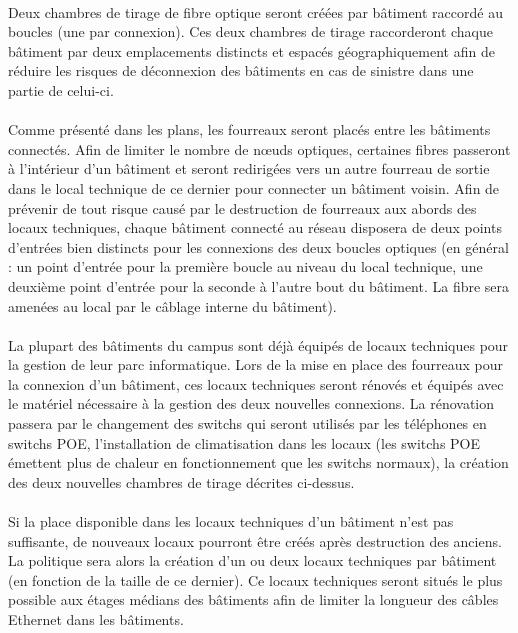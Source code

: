 \paragraph{} Deux chambres de tirage de fibre optique seront créées par bâtiment raccordé au boucles (une par connexion). Ces deux chambres de tirage raccorderont chaque bâtiment par deux emplacements distincts et espacés géographiquement afin de réduire les risques de déconnexion des bâtiments en cas de sinistre dans une partie de celui-ci.

\paragraph{} Comme présenté dans les plans, les fourreaux seront placés entre les bâtiments connectés. Afin de limiter le nombre de nœuds optiques, certaines fibres passeront à l'intérieur d'un bâtiment et seront redirigées vers un autre fourreau de sortie dans le local technique de ce dernier pour connecter un bâtiment voisin. Afin de prévenir de tout risque causé par le destruction de fourreaux aux abords des locaux techniques, chaque bâtiment connecté au réseau disposera de deux points d'entrées bien distincts pour les connexions des deux boucles optiques (en général : un point d'entrée pour la première boucle au niveau du local technique, une deuxième point d'entrée pour la seconde à l'autre bout du bâtiment. La fibre sera amenées au local par le câblage interne du bâtiment).

\paragraph{} La plupart des bâtiments du campus sont déjà équipés de locaux techniques pour la gestion de leur parc informatique. Lors de la mise en place des fourreaux pour la connexion d'un bâtiment, ces locaux techniques seront rénovés et équipés avec le matériel nécessaire à la gestion des deux nouvelles connexions. La rénovation passera par le changement des switchs qui seront utilisés par les téléphones en switchs POE, l'installation de climatisation dans les locaux (les switchs POE émettent plus de chaleur en fonctionnement que les switchs normaux), la création des deux nouvelles chambres de tirage décrites ci-dessus.

\paragraph{} Si la place disponible dans les locaux techniques d'un bâtiment n'est pas suffisante, de nouveaux locaux pourront être créés après destruction des anciens. La politique sera alors la création d'un ou deux locaux techniques par bâtiment (en fonction de la taille de ce dernier). Ce locaux techniques seront situés le plus possible aux étages médians des bâtiments afin de limiter la longueur des câbles Ethernet dans les bâtiments. 